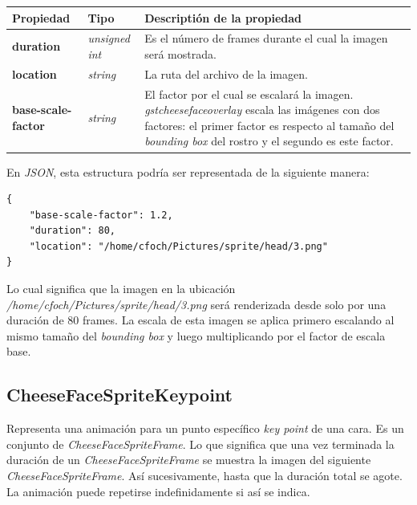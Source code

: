 \documentclass[a4paper,openright,12pt]{report}
\begin{document}
\begin{center}
  \begin{longtable}{| p{} | p{} | p{} |}
  \hline

  \textbf{Propiedad} &
  \textbf{Tipo} &
  \textbf{Descriptión de la propiedad}
  \\ \hline

  \textbf{duration} &
  \textit{unsigned int} &
  Es el número de frames durante el cual la imagen será mostrada.
  \\ \hline

  \textbf{location} &
  \textit{string} &
  La ruta del archivo de la imagen.
  \\ \hline

  \textbf{base-scale-factor} &
  \textit{string} &
  El factor por el cual se escalará la imagen. \textit{gstcheesefaceoverlay}
  escala las imágenes con dos factores: el primer factor es respecto al tamaño
  del \textit{bounding box} del rostro y el segundo es este factor.
  \\ \hline
  \end{longtable}
\end{center}

En \textit{JSON}, esta estructura podría ser representada de la siguiente
manera:\\
\begin{verbatim}
{
    "base-scale-factor": 1.2,
    "duration": 80,
    "location": "/home/cfoch/Pictures/sprite/head/3.png"
}
\end{verbatim}

Lo cual significa que la imagen en la ubicación
\textit{/home/cfoch/Pictures/sprite/head/3.png} será renderizada desde solo por
una duración de 80 frames. La escala de esta imagen se aplica primero escalando
al mismo tamaño del \textit{bounding box} y luego multiplicando por el factor de
escala base.\\

\subsection{CheeseFaceSpriteKeypoint}
Representa una animación para un punto específico \textit{key point} de una
cara. Es un conjunto de \textit{CheeseFaceSpriteFrame}. Lo que significa que una
vez terminada la duración de un \textit{CheeseFaceSpriteFrame} se muestra la
imagen del siguiente \textit{CheeseFaceSpriteFrame}. Así sucesivamente, hasta
que la duración total se agote. La animación puede repetirse indefinidamente si
así se indica.
\end{document}
